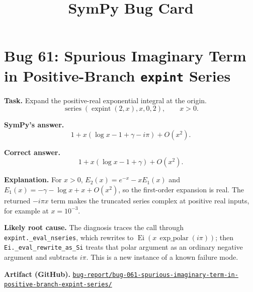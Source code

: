 \documentclass[11pt]{article}
\title{SymPy Bug Card}
\author{}
\date{}
\newcommand{\artifactrepo}{https://github.com/TODO-org/TODO-repo}
\newcommand{\bugbundle}[1]{\href{\artifactrepo/tree/main/bug-report/#1}{\nolinkurl{bug-report/#1/}}}
\begin{document}
\maketitle

\section*{Bug 61: Spurious Imaginary Term in Positive-Branch \texorpdfstring{\texttt{expint}}{expint} Series}

\begin{counterexamplebox}
\textbf{Task.} Expand the positive-real exponential integral at the origin.
\[
\operatorname{series}(\operatorname{expint}(2,x),x,0,2),
\qquad x>0 .
\]

\medskip
\textbf{SymPy's answer.}
\[
1+x(\log x-1+\gamma-i\pi)+O(x^2).
\]

\medskip
\textbf{Correct answer.}
\[
1+x(\log x-1+\gamma)+O(x^2).
\]

\medskip
\textbf{Explanation.} For \(x>0\),
\(E_2(x)=e^{-x}-xE_1(x)\) and
\(E_1(x)=-\gamma-\log x+x+O(x^2)\), so the first-order expansion is real.  The
returned \(-i\pi x\) term makes the truncated series complex at positive real
inputs, for example at \(x=10^{-3}\).

\medskip
\textbf{Likely root cause.} The diagnosis traces the call through
\texttt{expint.\_eval\_nseries}, which rewrites to
\(\operatorname{Ei}(x\,\operatorname{exp\_polar}(i\pi))\); then
\texttt{Ei.\_eval\_rewrite\_as\_Si} treats that polar argument as an ordinary
negative argument and subtracts \(i\pi\).  This is a new instance of a known
failure mode.

\medskip
\textbf{Artifact (GitHub).} \bugbundle{bug-061-spurious-imaginary-term-in-positive-branch-expint-series}
\end{counterexamplebox}
\end{document}
